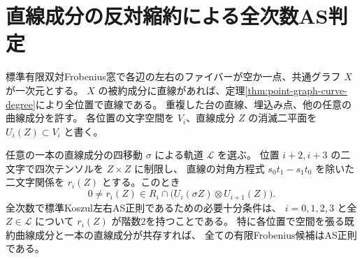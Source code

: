 \section{直線成分の反対縮約による全次数AS判定}
\label{sec:line-component-as-test}
標準有限双対Frobenius窓で各辺の左右のファイバーが空か一点、共通グラフ $X$ が一次元とする。
$X$ の被約成分に直線があれば、定理\ref{thm:point-graph-curve-degree}により全位置で直線である。
重複した台の直線、埋込み点、他の任意の曲線成分を許す。
各位置の文字空間を $V_i$、直線成分 $Z$ の消滅二平面を $U_i(Z)\subset V_i$ と書く。

\begin{theorem}\label{thm:line-component-as-test}
任意の一本の直線成分の四移動 $\sigma$ による軌道 $\mathcal L$ を選ぶ。
位置 $i+2,i+3$ の二文字で四次テンソルを $Z\times Z$ に制限し、
直線の対角方程式 $s_0t_1-s_1t_0$ を除いた二文字関係を $r_i(Z)$ とする。このとき
\[
 0\ne r_i(Z)\in R_i\cap\big(U_i(\sigma Z)\otimes U_{i+1}(Z)\big).
\]
全次数で標準Koszul左右AS正則であるための必要十分条件は、
$i=0,1,2,3$ と全 $Z\in\mathcal L$ について $r_i(Z)$ が階数2を持つことである。
特に各位置で空間を張る既約曲線成分と一本の直線成分が共存すれば、
全ての有限Frobenius候補はAS正則である。
\end{theorem}
